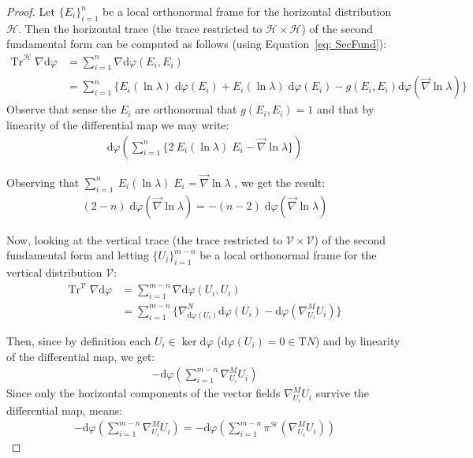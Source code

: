 \documentclass[12pt]{article}
\newcommand{\Dd}{\nabla \text{d}}
\newcommand{\diff}{\text{d}}
\theoremstyle{definition}
\numberwithin{equation}{subsection}
\begin{document}
\begin{proof}
Let $\{ E_i \}_{i=1}^n$ be a local orthonormal frame for the horizontal distribution $\mathcal{H}$. Then the horizontal trace (the trace restricted to $\mathcal{H} \times \mathcal{H}$) of the second fundamental form can be computed as follows (using Equation~\ref{eq: SecFund}):
\begin{align*}
    \text{Tr}^\mathcal{H}\; \Dd \varphi  &= \sum_{i=1}^n \Dd \varphi (E_i, E_i)\\
    &=\sum_{i=1}^n \big\{E_i( \ln \lambda)\; \diff \varphi (E_i) + E_i (\ln \lambda)\; \diff \varphi (E_i) - g(E_i, E_i) \diff \varphi (\vec{\nabla} \ln \lambda) \big\} 
\end{align*}
Observe that sense the $E_i$ are orthonormal that $g(E_i, E_i) = 1$ and that by linearity of the differential map we may write:
\begin{align*}
    \diff \varphi\left(\sum_{i=1}^n \big\{2 \:E_i( \ln \lambda)\; E_i -  \vec{\nabla} \ln \lambda \big\} \right) 
\end{align*}

Observing that $\sum_{i=1}^n  \:E_i( \ln \lambda)\; E_i = \vec{\nabla} \ln \lambda$ , we get the result:
\begin{align}\label{eq: horTr}
    (2 - n) \; \diff \varphi ( \vec{\nabla} \ln \lambda ) = - (n - 2) \; \diff \varphi ( \vec{\nabla} \ln \lambda )
\end{align}

Now, looking at the vertical trace (the trace restricted to $\mathcal{V} \times \mathcal{V}$) of the second fundamental form  and letting $\{U_i \}_{i=1}^{m -n}$ be a local orthonormal frame for the vertical distribution $\mathcal{V}$:
\begin{align*}
    \text{Tr}^\mathcal{V} \;\Dd \varphi &= \sum_{i=1}^{m - n} \Dd \varphi (U_i, U_i) \\
    &=\sum_{i=1}^{m - n} \big\{ \nabla_{\diff \varphi (U_i)}^N \diff \varphi(U_i) - \diff \varphi (\nabla_{U_i} ^ M U_i) \big\}
\end{align*}

Then, since by definition  each $U_i \in \ker \diff \varphi$ ($\diff \varphi (U_i) = 0 \in \text{T}N$) and by linearity of the differential map, we get:
\begin{align*}
    -\diff \varphi \left( \sum_{i=1}^{m - n}  \nabla_{U_i} ^ M U_i  \right)
\end{align*}
Since only the horizontal components of the vector fields $\nabla_{U_i} ^ M U_i$ survive the differential map, means:
\begin{align*}
    -\diff \varphi \left( \sum_{i=1}^{m - n}  \nabla_{U_i} ^ M U_i  \right) = 
    -\diff \varphi \left( \sum_{i=1}^{m - n} \pi^\mathcal{H} ( \nabla_{U_i} ^ M U_i ) \right)
\end{align*}


\end{proof}
\end{document}
